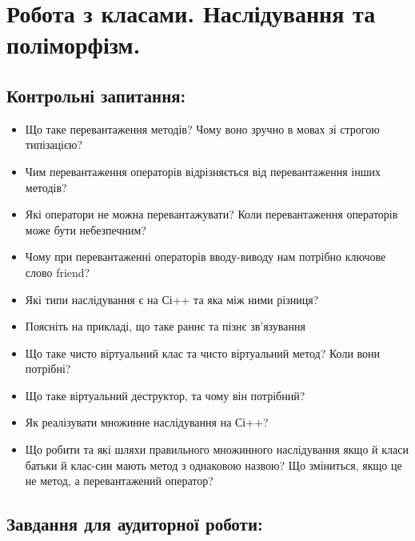 \documentclass[a5paper,titlepage,openany,twoside,draft]{book_unv}%
\begin{document}
\chapter{Робота з класами. Наслідування та поліморфізм.}
%

\section{Контрольні запитання:}
\begin{itemize}
\item
  Що таке перевантаження методів? Чому воно зручно в мовах зі строгою
  типізацією?
\item
  Чим перевантаження операторів відрізняється від перевантаження інших
  методів?
\item
  Які оператори не можна перевантажувати? Коли перевантаження операторів
  може бути небезпечним?
\item
  Чому при перевантаженні операторів вводу-виводу нам потрібно ключове
  слово friend?
\item
  Які типи наслідування є на Сі++ та яка між ними різниця?
\item
  Поясніть на прикладі, що таке раннє та пізнє зв'язування
\item
  Що таке чисто віртуальний клас та чисто віртуальний метод? Коли вони
  потрібні?
\item
  Що таке віртуальний деструктор, та чому він потрібний?
\item
  Як реалізувати множинне наслідування на Сі++?
\item
  Що робити та які шляхи правильного множинного наслідування якщо й
  класи батьки й клас-син мають метод з однаковою назвою? Що зміниться,
  якщо це не метод, а перевантажений оператор?
\end{itemize}

\section{Завдання для аудиторної роботи:}
\end{document}

